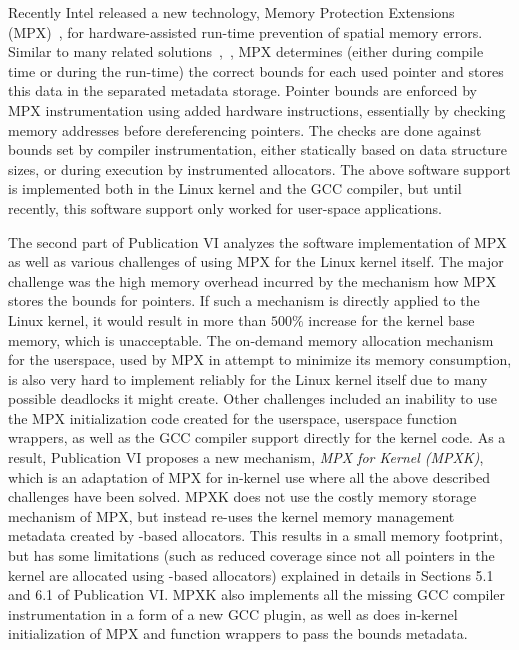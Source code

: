 Recently Intel released a new technology, \intel Memory Protection Extensions (MPX)~\cite{ramakesavan2015intel}, for hardware-assisted run-time prevention of spatial memory errors.  Similar to many related solutions~\cite{jones1997backwards},~\cite{nagarakatte2009softbound}, MPX determines (either during compile time or during the run-time) the correct bounds for each used pointer and stores this data in the separated metadata storage. Pointer bounds are enforced by MPX instrumentation using added hardware instructions, essentially by checking memory addresses before dereferencing pointers. The checks are done against bounds set by compiler instrumentation, either statically based on data structure sizes, or during execution by instrumented allocators. The above software support is implemented both in the Linux kernel and the GCC compiler, but until recently, this software support only worked for user-space applications. 
 
The second part of Publication VI analyzes the software implementation of \intel MPX as well as various challenges of using MPX for the Linux kernel itself. The major challenge was the high memory overhead incurred by the mechanism how MPX stores the bounds for pointers. If such a mechanism is directly applied to the Linux kernel, it would result in more than $500\%$ increase for the kernel base memory, which is unacceptable. The on-demand memory allocation mechanism for the userspace, used by MPX in attempt to minimize its memory consumption, is also very hard to implement reliably for the Linux kernel itself due to many possible deadlocks it might create. Other challenges included an inability to use the MPX initialization code created for the userspace, userspace function wrappers, as well as the GCC compiler support directly for the kernel code.
As a result, Publication VI proposes a new mechanism, \emph{MPX for Kernel (MPXK)}, which is an adaptation of \intel MPX for in-kernel use where all the above described challenges have been solved. MPXK does not use the costly memory storage mechanism of MPX, but instead re-uses the kernel memory management metadata created by -based allocators. This results in a small memory footprint, but has some limitations (such as reduced coverage since not all pointers in the kernel are allocated using -based allocators) explained in details in Sections 5.1 and 6.1 of Publication VI. MPXK also implements all the missing GCC compiler instrumentation in a form of a new GCC plugin, as well as does in-kernel initialization of MPX and function wrappers to pass the bounds metadata. 

